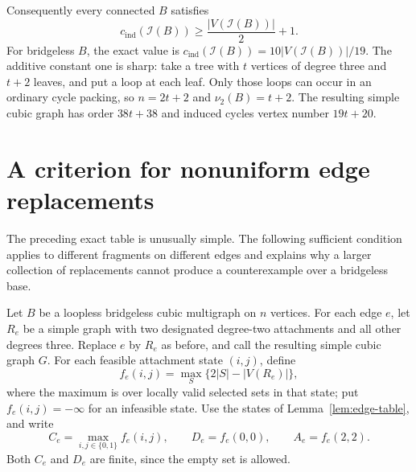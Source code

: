 \documentclass[11pt]{article}
\newcommand{\cind}{c_{\mathrm{ind}}}
\begin{document}
Consequently every connected $B$ satisfies
\[
 \cind(\mathcal I(B))\geq\frac{|V(\mathcal I(B))|}{2}+1.
\]
For bridgeless $B$, the exact value is
$\cind(\mathcal I(B))=10|V(\mathcal I(B))|/19$.
The additive constant one is sharp: take a tree with $t$ vertices
of degree three and $t+2$ leaves, and put a loop at each leaf.
Only those loops can occur in an ordinary cycle packing, so
$n=2t+2$ and $\nu_2(B)=t+2$. The resulting simple cubic graph has
order $38t+38$ and induced cycles vertex number $19t+20$.

\section{A criterion for nonuniform edge replacements}
The preceding exact table is unusually simple. The following
sufficient condition applies to different fragments on different
edges and explains why a larger collection of replacements cannot
produce a counterexample over a bridgeless base.

Let $B$ be a loopless bridgeless cubic multigraph on $n$ vertices.
For each edge $e$, let $R_e$ be a simple graph with two designated
degree-two attachments and all other degrees three. Replace $e$
by $R_e$ as before, and call the resulting simple cubic graph $G$.
For each feasible attachment state $(i,j)$, define
\[
 f_e(i,j)=\max_S\{2|S|-|V(R_e)|\},
\]
where the maximum is over locally valid selected sets in that state;
put $f_e(i,j)=-\infty$ for an infeasible state. Use the states of
Lemma~\ref{lem:edge-table}, and write
\[
 C_e=\max_{i,j\in\{0,1\}}f_e(i,j),\qquad
 D_e=f_e(0,0),\qquad A_e=f_e(2,2).
\]
Both $C_e$ and $D_e$ are finite, since the empty set is allowed.
\end{document}
